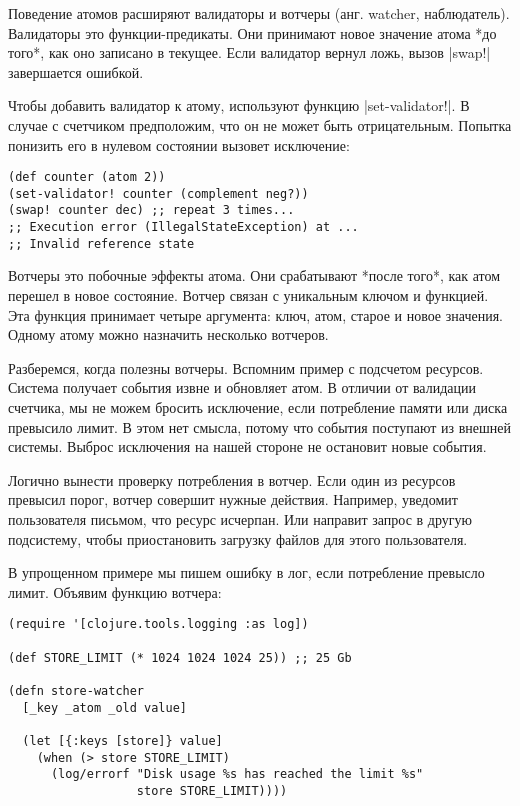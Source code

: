 Поведение атомов расширяют валидаторы и вотчеры (анг. watcher,
наблюдатель). Валидаторы это функции-предикаты. Они принимают новое значение
атома *до того*, как оно записано в текущее. Если валидатор вернул ложь, вызов
\spverb|swap!| завершается ошибкой.

Чтобы добавить валидатор к атому, используют функцию \spverb|set-validator!|. В случае
с счетчиком предположим, что он не может быть отрицательным. Попытка понизить
его в нулевом состоянии вызовет исключение:

\begin{verbatim}
(def counter (atom 2))
(set-validator! counter (complement neg?))
(swap! counter dec) ;; repeat 3 times...
;; Execution error (IllegalStateException) at ...
;; Invalid reference state
\end{verbatim}

Вотчеры это побочные эффекты атома. Они срабатывают *после того*, как атом
перешел в новое состояние. Вотчер связан с уникальным ключом и функцией. Эта
функция принимает четыре аргумента: ключ, атом, старое и новое значения. Одному
атому можно назначить несколько вотчеров.

Разберемся, когда полезны вотчеры. Вспомним пример с подсчетом ресурсов. Система
получает события извне и обновляет атом. В отличии от валидации счетчика, мы не
можем бросить исключение, если потребление памяти или диска превысило лимит. В
этом нет смысла, потому что события поступают из внешней системы. Выброс
исключения на нашей стороне не остановит новые события.

Логично вынести проверку потребления в вотчер. Если один из ресурсов превысил
порог, вотчер совершит нужные действия. Например, уведомит пользователя письмом,
что ресурс исчерпан. Или направит запрос в другую подсистему, чтобы
приостановить загрузку файлов для этого пользователя.

В упрощенном примере мы пишем ошибку в лог, если потребление превысло
лимит. Объявим функцию вотчера:

\begin{verbatim}
(require '[clojure.tools.logging :as log])

(def STORE_LIMIT (* 1024 1024 1024 25)) ;; 25 Gb

(defn store-watcher
  [_key _atom _old value]

  (let [{:keys [store]} value]
    (when (> store STORE_LIMIT)
      (log/errorf "Disk usage %s has reached the limit %s"
                  store STORE_LIMIT))))
\end{verbatim}

